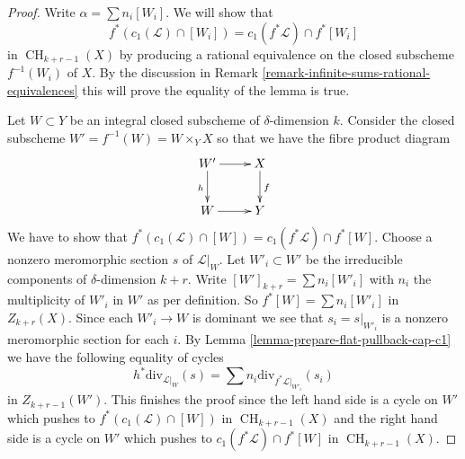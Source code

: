 \documentclass[10pt,a4paper]{amsart}
\theoremstyle{plain}
\theoremstyle{definition}
\theoremstyle{remark}
\numberwithin{equation}{subsection}
\def\CH{\mathop{\mathrm{CH}}\nolimits}
\begin{document}
\begin{proof}
Write $\alpha = \sum n_i[W_i]$. We will show that
$$
f^*(c_1(\mathcal{L}) \cap [W_i]) = c_1(f^*\mathcal{L}) \cap f^*[W_i]
$$
in $\CH_{k + r - 1}(X)$ by producing a rational equivalence
on the closed subscheme $f^{-1}(W_i)$ of $X$.
By the discussion in
Remark \ref{remark-infinite-sums-rational-equivalences}
this will prove the equality of the lemma is true.

\medskip\noindent
Let $W \subset Y$ be an integral closed subscheme of $\delta$-dimension $k$.
Consider the closed subscheme $W' = f^{-1}(W) = W \times_Y X$
so that we have the fibre product diagram
$$
\xymatrix{
W' \ar[r] \ar[d]_h & X \ar[d]^f \\
W \ar[r] & Y
}
$$
We have to show that
$f^*(c_1(\mathcal{L}) \cap [W]) = c_1(f^*\mathcal{L}) \cap f^*[W]$.
Choose a nonzero meromorphic section $s$ of $\mathcal{L}|_W$.
Let $W'_i \subset W'$ be the irreducible components of
$\delta$-dimension $k + r$. Write $[W']_{k + r} = \sum n_i[W'_i]$
with $n_i$ the multiplicity of $W'_i$ in $W'$ as per definition.
So $f^*[W] = \sum n_i[W'_i]$ in $Z_{k + r}(X)$.
Since each $W'_i \to W$ is dominant we
see that $s_i = s|_{W'_i}$ is a nonzero meromorphic section for
each $i$. By Lemma \ref{lemma-prepare-flat-pullback-cap-c1}
we have the following equality of cycles
$$
h^*\text{div}_{\mathcal{L}|_W}(s) =
\sum n_i\text{div}_{f^*\mathcal{L}|_{W'_i}}(s_i)
$$
in $Z_{k + r - 1}(W')$. This finishes the proof since
the left hand side is a cycle on $W'$ which pushes to
$f^*(c_1(\mathcal{L}) \cap [W])$ in $\CH_{k + r - 1}(X)$
and the right hand side is a cycle on $W'$ which pushes to
$c_1(f^*\mathcal{L}) \cap f^*[W]$ in $\CH_{k + r - 1}(X)$.
\end{proof}
\end{document}
